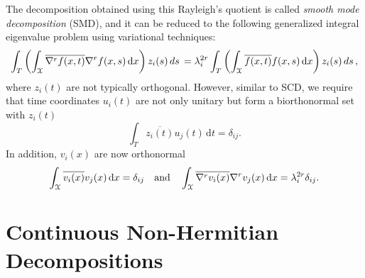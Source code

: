 \documentclass[10pt]{article}
\newcommand{\norm}[1]{\left\Vert#1\right\Vert}
\begin{document}
The decomposition obtained using this Rayleigh's quotient is called {\em smooth mode decomposition} (SMD), and it can be reduced to the following generalized integral eigenvalue problem using variational techniques:
\begin{equation}
    \int_T \left(\int_{\cal X} \overline{\nabla^{r} f(x,t)} \nabla^{r} f(x,s)\, \mathrm{d}x\right)  z_i(s)  \, ds \, =\lambda_{i}^{2r}  \int_T \left(\int_{\cal X} \overline{f(x,t)}f(x,s)\, \mathrm{d}x\right)  z_i(s)  \, ds\,,
\end{equation}
where $z_i(t)$ are not typically orthogonal. However, similar to SCD, we require that time coordinates $u_i(t)$ are not only unitary but form a biorthonormal set with $z_i(t)$ 
\begin{equation}
\int_T \overline {z_i(t)} u_j(t)\,  \mathrm{d} t = \delta_{ij}.
\end{equation}
In addition, $v_i(x)$ are now orthonormal
\begin{equation}
\int_{\cal X} \overline {v_i(x)} v_j(x)\,  \mathrm{d} x = \delta_{ij} \quad \mathrm{and} \quad 
\int_{\cal X} \overline{ \nabla^{r} v_i(x)} \nabla^{r} v_j(x)\,  \mathrm{d} x = \lambda^{2r}_i\delta_{ij}.
\end{equation}

\section{Continuous Non-Hermitian Decompositions}
\end{document}
